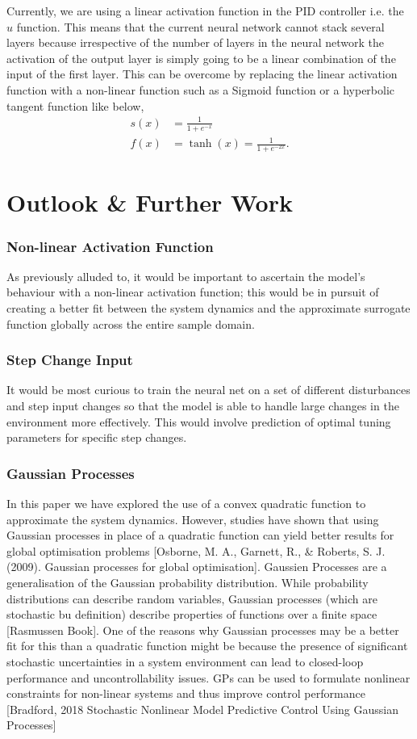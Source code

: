 \documentclass[conference]{IEEEtran}
\theoremstyle{definition}
\begin{document}
\noindent Currently, we are using a linear activation function in the PID controller i.e. the $u$ function. This means that the current neural network cannot stack several layers because irrespective of the number of layers in the neural network the activation of the output layer is simply going to be a linear combination of the input of the first layer. This can be overcome by replacing the linear activation function with a non-linear function such as a Sigmoid function or a hyperbolic tangent function like below, 
\begin{align}
    s(x) &= \frac{1}{1 + e^{-x}} \\
    f(x) &= \tanh(x) = \frac{1}{1+e^{-2x}}.
    \end{align}
\section{Outlook \& Further Work}
\subsubsection{Non-linear Activation Function}
\noindent As previously alluded to, it would be important to ascertain the model's behaviour with a non-linear activation function; this would be in pursuit of creating a better fit between the system dynamics and the approximate surrogate function globally across the entire sample domain.
\vspace{3mm}
\subsubsection{Step Change Input}
\noindent It would be most curious to train the neural net on a set of different disturbances and step input changes so that the model is able to handle large changes in the environment more effectively. This would involve prediction of optimal tuning parameters for specific step changes. 
\vspace{3mm}
\subsubsection{Gaussian Processes}
\noindent In this paper we have explored the use of a convex quadratic function to approximate the system dynamics. However, studies have shown that using Gaussian processes in place of a quadratic function can yield better results for global optimisation problems [Osborne, M. A., Garnett, R., \& Roberts, S. J. (2009). Gaussian processes for global optimisation]. Gaussien Processes are a generalisation of the Gaussian probability distribution. While probability distributions can describe random variables, Gaussian processes (which are stochastic bu definition) describe properties of functions over a finite space [Rasmussen Book]. One of the reasons why Gaussian processes may be a better fit for this than a quadratic function might be because the presence of significant stochastic uncertainties in a system environment can lead to closed-loop performance and uncontrollability issues. GPs can be used to formulate nonlinear constraints for non-linear systems and thus improve control performance [Bradford, 2018  Stochastic Nonlinear Model Predictive Control Using Gaussian Processes]
\vspace{3mm}
\end{document}
